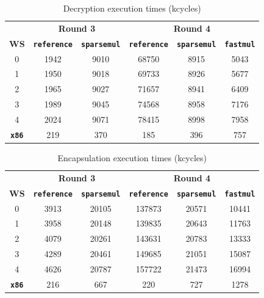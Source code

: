 \begin{table}[H]
    \centering
    \caption{Decryption execution times (kcycles)}
    \begin{tabular}{c|cc|ccc}
        \toprule
        & \multicolumn{2}{c|}{\textbf{Round 3}} & \multicolumn{3}{c}{\textbf{Round 4}} \\
        \textbf{WS} & \texttt{\textbf{reference}} & \texttt{\textbf{sparsemul}} & \texttt{\textbf{reference}} & \texttt{\textbf{sparsemul}} & \texttt{\textbf{fastmul}} \\
        \midrule
        0 & 1942 & 9010 & 68750 & 8915 & 5043 \\
        1 & 1950 & 9018 & 69733 & 8926 & 5677 \\
        2 & 1965 & 9027 & 71657 & 8941 & 6409 \\
        3 & 1989 & 9045 & 74568 & 8958 & 7176 \\
        4 & 2024 & 9071 & 78415 & 8998 & 7958 \\
        \midrule
        \textbf{\texttt{x86}} & 219 & 370 & 185 & 396 & 757 \\
        \bottomrule
    \end{tabular}
    \label{tab:decTiming}
\end{table}

\begin{table}[H]
    \centering
    \caption{Encapsulation execution times (kcycles)}
    \begin{tabular}{c|cc|ccc}
        \toprule
        & \multicolumn{2}{c|}{\textbf{Round 3}} & \multicolumn{3}{c}{\textbf{Round 4}} \\
        \textbf{WS} & \texttt{\textbf{reference}} & \texttt{\textbf{sparsemul}} & \texttt{\textbf{reference}} & \texttt{\textbf{sparsemul}} & \texttt{\textbf{fastmul}} \\
        \midrule
        0 & 3913 & 20105 & 137873 & 20571 & 10441 \\
        1 & 3958 & 20148 & 139835 & 20643 & 11763 \\
        2 & 4079 & 20261 & 143631 & 20783 & 13333 \\
        3 & 4289 & 20461 & 149685 & 21051 & 15087 \\
        4 & 4626 & 20787 & 157722 & 21473 & 16994 \\
        \midrule
        \textbf{\texttt{x86}} & 216 & 667 & 220 & 727 & 1278 \\
        \bottomrule
    \end{tabular}
    \label{tab:encapsTiming}
\end{table}


